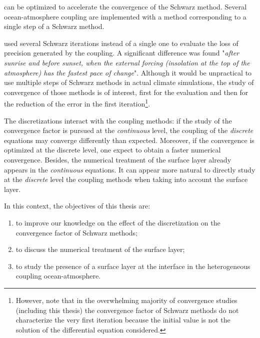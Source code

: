 can be optimized to accelerate the convergence of the
Schwarz method.
Several ocean-atmosphere coupling are implemented with
a method corresponding to a single step of a Schwarz method.
\par %
\citep{marti_schwarz_2021} used several Schwarz iterations
instead of a single one to evaluate the loss of precision
generated by the coupling. A significant difference was found
"\textit{after sunrise
and before sunset, when the external forcing (insolation at
the top of the atmosphere) has the fastest pace of change}".
Although it would be unpractical to use multiple
steps of Schwarz methods in actual climate simulations,
the study of convergence of those methods is of interest,
first for the evaluation and then for the reduction of the
error in the first iteration\footnote{However, note that
in the overwhelming majority of convergence studies
(including this thesis) the convergence factor of
Schwarz methods do not characterize the very first iteration
because the initial value is not the solution of the
differential equation considered.}.
\par %
The discretizations interact with the coupling methods:
if the study of the convergence factor is pursued at the
\textit{continuous} level, the coupling of the \textit{discrete}
equations may converge differently than expected. Moreover,
if the convergence is optimized at the discrete level, one expect
to obtain a faster numerical convergence.
Besides, the numerical treatment of the surface layer already
appears in the \textit{continuous} equations.
It can appear more natural to directly study at the \textit{discrete}
level the coupling methods when taking into account
the surface layer.
\par %
In this context, the objectives of this thesis are:
\begin{enumerate}
\item to improve our knowledge on the effect of the discretization
on the convergence factor of Schwarz methods;
\item to discuss the numerical treatment of the surface layer;
\item to study the presence of a surface layer at the interface in
the heterogeneous coupling ocean-atmosphere.
\end{enumerate}
